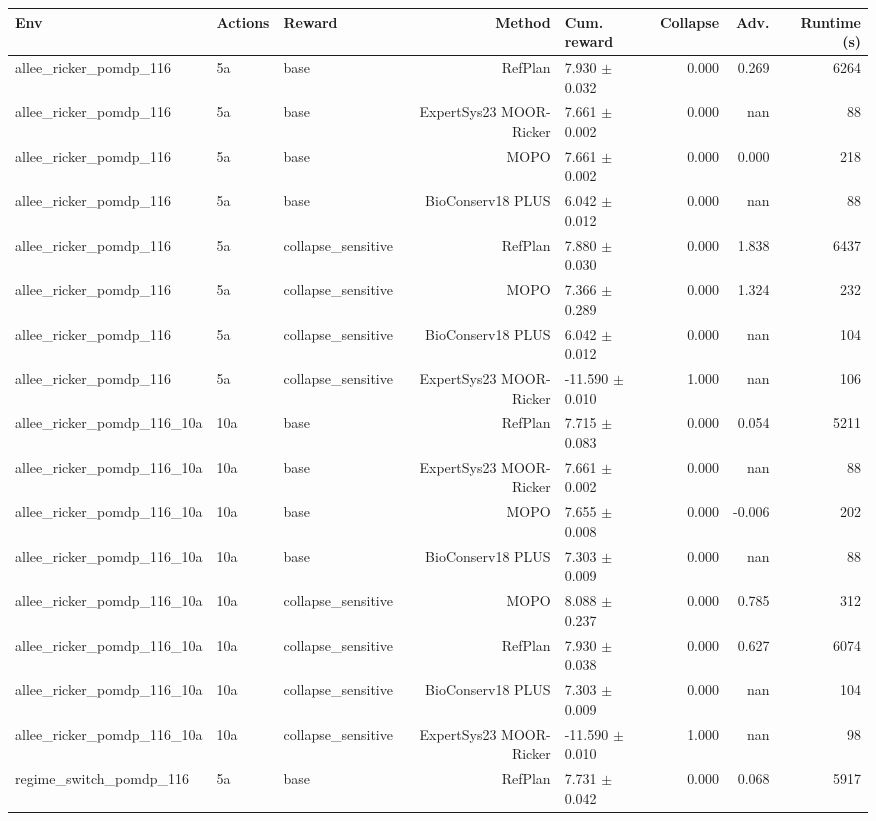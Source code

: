 \documentclass{article}
\begin{document}
\begin{longtable}{lllrlrrr}
\toprule
Env & Actions & Reward & Method & Cum. reward & Collapse & Adv. & Runtime (s) \\
\midrule
allee\_ricker\_pomdp\_116 & 5a & base & RefPlan & 7.930 $\pm$ 0.032 & 0.000 & 0.269 & 6264 \\
allee\_ricker\_pomdp\_116 & 5a & base & ExpertSys23 MOOR-Ricker & 7.661 $\pm$ 0.002 & 0.000 & nan & 88 \\
allee\_ricker\_pomdp\_116 & 5a & base & MOPO & 7.661 $\pm$ 0.002 & 0.000 & 0.000 & 218 \\
allee\_ricker\_pomdp\_116 & 5a & base & BioConserv18 PLUS & 6.042 $\pm$ 0.012 & 0.000 & nan & 88 \\
allee\_ricker\_pomdp\_116 & 5a & collapse\_sensitive & RefPlan & 7.880 $\pm$ 0.030 & 0.000 & 1.838 & 6437 \\
allee\_ricker\_pomdp\_116 & 5a & collapse\_sensitive & MOPO & 7.366 $\pm$ 0.289 & 0.000 & 1.324 & 232 \\
allee\_ricker\_pomdp\_116 & 5a & collapse\_sensitive & BioConserv18 PLUS & 6.042 $\pm$ 0.012 & 0.000 & nan & 104 \\
allee\_ricker\_pomdp\_116 & 5a & collapse\_sensitive & ExpertSys23 MOOR-Ricker & -11.590 $\pm$ 0.010 & 1.000 & nan & 106 \\
allee\_ricker\_pomdp\_116\_10a & 10a & base & RefPlan & 7.715 $\pm$ 0.083 & 0.000 & 0.054 & 5211 \\
allee\_ricker\_pomdp\_116\_10a & 10a & base & ExpertSys23 MOOR-Ricker & 7.661 $\pm$ 0.002 & 0.000 & nan & 88 \\
allee\_ricker\_pomdp\_116\_10a & 10a & base & MOPO & 7.655 $\pm$ 0.008 & 0.000 & -0.006 & 202 \\
allee\_ricker\_pomdp\_116\_10a & 10a & base & BioConserv18 PLUS & 7.303 $\pm$ 0.009 & 0.000 & nan & 88 \\
allee\_ricker\_pomdp\_116\_10a & 10a & collapse\_sensitive & MOPO & 8.088 $\pm$ 0.237 & 0.000 & 0.785 & 312 \\
allee\_ricker\_pomdp\_116\_10a & 10a & collapse\_sensitive & RefPlan & 7.930 $\pm$ 0.038 & 0.000 & 0.627 & 6074 \\
allee\_ricker\_pomdp\_116\_10a & 10a & collapse\_sensitive & BioConserv18 PLUS & 7.303 $\pm$ 0.009 & 0.000 & nan & 104 \\
allee\_ricker\_pomdp\_116\_10a & 10a & collapse\_sensitive & ExpertSys23 MOOR-Ricker & -11.590 $\pm$ 0.010 & 1.000 & nan & 98 \\
regime\_switch\_pomdp\_116 & 5a & base & RefPlan & 7.731 $\pm$ 0.042 & 0.000 & 0.068 & 5917 \\

\end{longtable}
\end{document}
